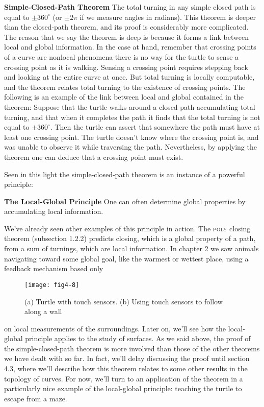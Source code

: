 \documentclass{book}
\begin{document}
\textbf{Simple-Closed-Path Theorem} The total turning in any simple closed
path is equal to $\pm 360^{\circ}$ (or $\pm 2\pi$ if we measure angles in radians).
This theorem is deeper than the closed-path theorem, and its proof is
considerably more complicated. The reason that we say the theorem is
deep is because it forms a link between local and global information. In
the case at hand, remember that crossing points of a curve are nonlocal
phenomena-there is no way for the turtle to sense a crossing point as it
is walking. Sensing a crossing point requires stepping back and looking
at the entire curve at once. But total turning is locally computable, and
the theorem relates total turning to the existence of crossing points.
The following is an example of the link between local and global
contained in the theorem: Suppose that the turtle walks around a closed
path accumulating total turning, and that when it completes the path it
finds that the total turning is not equal to $\pm 360^{\circ}$. Then the turtle can
assert that somewhere the path must have at least one crossing point.
The turtle doesn't know where the crossing point is, and was unable
to observe it while traversing the path. Nevertheless, by applying the
theorem one can deduce that a crossing point must exist.

Seen in this light the simple-closed-path theorem is an instance of a
powerful principle:

\textbf{The Local-Global Principle} One can often determine global properties
by accumulating local information.

We've already seen other examples of this principle in action. The \textsc{poly}
closing theorem (subsection 1.2.2) predicts closing, which is a global
property of a path, from a sum of turnings, which are local information.
In chapter 2 we saw animals navigating toward some global goal, like
the warmest or wettest place, using a feedback mechanism based only

\begin{figure}
\begin{center}
\texttt{[image: fig4-8]}
\caption{(a) Turtle with touch sensors. (b) Using touch sensors to follow along a wall}
\end{center}
\end{figure}

on local measurements of the surroundings. Later on, we'll see how the
local-global principle applies to the study of surfaces.
As we said above, the proof of the simple-closed-path theorem is more
involved than those of the other theorems we have dealt with so far.
In fact, we'll delay discussing the proof until section 4.3, where we'll
describe how this theorem relates to some other results in the topology
of curves. For now, we'll turn to an application of the theorem in a
particularly nice example of the local-global principle: teaching the turtle
to escape from a maze.
\end{document}
